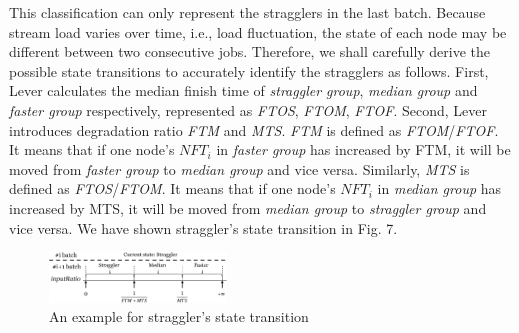 \documentclass[10pt,conference,compsocconf,letterpaper]{IEEEtran}
\begin{document}
  This classification can only represent the stragglers in the last batch. Because stream load varies over time, i.e., load fluctuation, the state of each node may be different between two consecutive jobs. Therefore, we shall carefully derive the possible state transitions to accurately identify the stragglers as follows. First, Lever calculates the median finish time of \emph{straggler group}, \emph{median group} and \emph{faster group} respectively, represented as \emph{FTOS}, \emph{FTOM}, \emph{FTOF}. Second, Lever introduces degradation ratio \emph{FTM} and \emph{MTS}. \emph{FTM} is defined as \emph{FTOM}/\emph{FTOF}. It means that if one node's $NFT_i$ in \emph{faster group} has increased by FTM, it will be moved from \emph{faster group} to \emph{median group} and vice versa. Similarly, \emph{MTS} is defined as \emph{FTOS}/\emph{FTOM}. It means that if one node's $NFT_i$ in \emph{median group} has increased by MTS, it will be moved from \emph{median group} to \emph{straggler group} and vice versa. We have shown straggler's state transition in Fig. 7.
  \begin{figure}[htbp]
    \centering
    \includegraphics[width=0.42\textwidth]{FigureI2}
    \caption{An example for straggler's state transition}
    \label{Fig. 7:}
  \end{figure}
\end{document}
